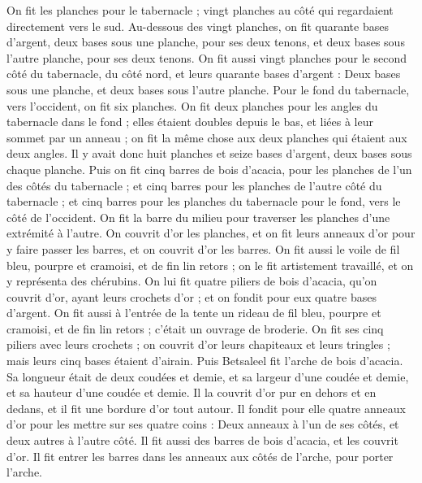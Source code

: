 \begin{multicols}{2}
On fit les planches pour le tabernacle ; vingt planches au côté qui regardaient directement vers le sud.
Au-dessous des vingt planches, on fit quarante bases d'argent, deux bases sous une planche, pour ses deux tenons, et deux bases sous l'autre planche, pour ses deux tenons.
On fit aussi vingt planches pour le second côté du tabernacle, du côté nord,
et leurs quarante bases d'argent : Deux bases sous une planche, et deux bases sous l'autre planche.
Pour le fond du tabernacle, vers l'occident, on fit six planches.
On fit deux planches pour les angles du tabernacle dans le fond ;
elles étaient doubles depuis le bas, et liées à leur sommet par un anneau ; on fit la même chose aux deux planches qui étaient aux deux angles.
Il y avait donc huit planches et seize bases d'argent, deux bases sous chaque planche.
Puis on fit cinq barres de bois d’acacia, pour les planches de l'un des côtés du tabernacle ;
et cinq barres pour les planches de l'autre côté du tabernacle ; et cinq barres pour les planches du tabernacle pour le fond, vers le côté de l'occident.
On fit la barre du milieu pour traverser les planches d’une extrémité à l’autre.
On couvrit d'or les planches, et on fit leurs anneaux d'or pour y faire passer les barres, et on couvrit d'or les barres.
On fit aussi le voile de fil bleu, pourpre et cramoisi, et de fin lin retors ; on le fit artistement travaillé, et on y représenta des chérubins.
On lui fit quatre piliers de bois d’acacia, qu'on couvrit d'or, ayant leurs crochets d'or ; et on fondit pour eux quatre bases d'argent.
On fit aussi à l'entrée de la tente un rideau de fil bleu, pourpre et cramoisi, et de fin lin retors ; c’était un ouvrage de broderie.
On fit ses cinq piliers avec leurs crochets ; on couvrit d'or leurs chapiteaux et leurs tringles ; mais leurs cinq bases étaient d'airain.
\VerseOne{}Puis Betsaleel fit l'arche de bois d’acacia. Sa longueur était de deux coudées et demie, et sa largeur d'une coudée et demie, et sa hauteur d'une coudée et demie.
Il la couvrit d’or pur en dehors et en dedans, et il fit une bordure d'or tout autour.
Il fondit pour elle quatre anneaux d'or pour les mettre sur ses quatre coins : Deux anneaux à l'un de ses côtés, et deux autres à l'autre côté.
Il fit aussi des barres de bois d’acacia, et les couvrit d'or.
Il fit entrer les barres dans les anneaux aux côtés de l'arche, pour porter l'arche.

\end{multicols}
